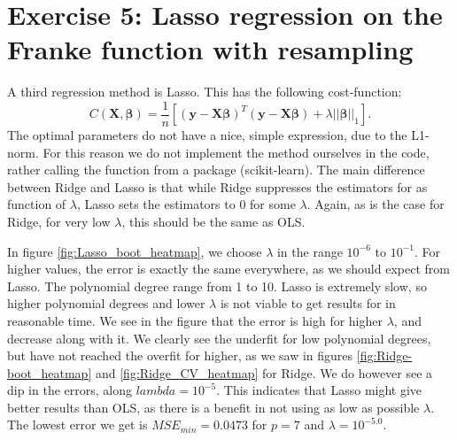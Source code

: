 \documentclass[reprint,english,notitlepage,aps,nobalancelastpage,nofootinbib]{revtex4-1}  %
\begin{document}


\section*{Exercise 5: Lasso regression on the Franke function with resampling}

A third regression method is Lasso. This has the following cost-function:
\begin{equation*}
	C(\mathbf{X}, \boldsymbol{\beta}) = \frac{1}{n}\left[\left(\mathbf{y}-\mathbf{X}\boldsymbol\beta \right)^T \left(\mathbf{y}-\mathbf{X}\boldsymbol\beta \right)+\lambda ||\boldsymbol{\beta}||_1 \right].
\end{equation*}
The optimal parameters do not have a nice, simple expression, due to the L1-norm. For this reason we do not implement the method ourselves in the code, rather calling the function from a package (scikit-learn).  The main difference between Ridge and Lasso is that while Ridge suppresses the estimators for as function of $\lambda$, Lasso sets the estimators to 0 for some $\lambda$. Again, as is the case for Ridge, for very low $\lambda$, this should be the same as OLS.

In figure \ref{fig:Lasso_boot_heatmap}, we choose $\lambda$ in the range $10^{-6}$ to $10^{-1}$. For higher values, the error is exactly the same everywhere, as we should expect from Lasso. The polynomial degree range from 1 to 10. Lasso is extremely slow, so higher polynomial degrees and lower $\lambda$ is not viable to get results for in reasonable time. We see in the figure that the error is high for higher $\lambda$, and decrease along with it. We clearly see the underfit for low polynomial degrees, but have not reached the overfit for higher, as we saw in figures \ref{fig:Ridge-boot_heatmap} and \ref{fig:Ridge_CV_heatmap} for Ridge. We do however see a dip in the errors, along $lambda=10^{-5}$. This indicates that Lasso might give better results than OLS, as there is a benefit in not using as low as possible $\lambda$. The lowest error we get is $MSE_{min}=0.0473$ for $p=7$ and $\lambda=10^{-5.0}$.
\end{document}
